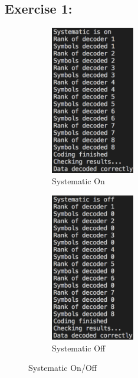 \subsection{Exercise 1:}
\begin{figure}[H]
    \centering
    \begin{subfigure}{.49\textwidth}
        \centering
        \includegraphics[width=0.4\textwidth]{figures/KodoPython/systematic_on.png}
        \caption{Systematic On}
        \label{fig:systematic_on}
    \end{subfigure}
    \begin{subfigure}{.5\textwidth}
        \centering
        \includegraphics[width=0.4\textwidth]{figures/KodoPython/systematic_off.png}
        \caption{Systematic Off}
        \label{fig:encode_timings}
    \end{subfigure}
    \caption{Systematic On/Off}
    \label{fig:systematic_on_off}
\end{figure}
